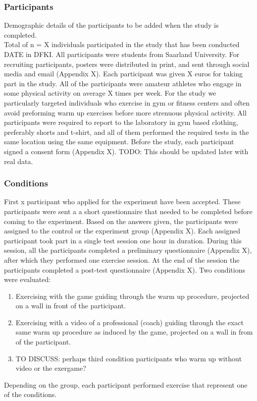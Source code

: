 \subsubsection{Participants}
Demographic details of the participants to be added when the study is completed.\\
Total of n = X individuals participated in the study that has been conducted DATE in DFKI. All participants were students from Saarland University. For recruiting participants, posters were distributed in print, and sent through social media and email (Appendix X). Each participant was given X euros for taking part in the study. All of the participants were amateur athletes who engage in some physical activity on average X times per week. For the study we particularly targeted individuals who exercise in gym or fitness centers and often avoid preforming warm up exercises before more strenuous physical activity. All participants were required to report to the laboratory in gym based clothing, preferably shorts and t-shirt, and all of them performed the required tests in the same location using the same equipment. Before the study, each participant signed a consent form (Appendix X). TODO: This should be updated later with real data.
\subsubsection{Conditions}
First x participant who applied for the experiment have been accepted. These participants were sent a a short questionnaire that needed to be completed before coming to the experiment. Based on the answers given, the participants were assigned to the control or the experiment group (Appendix X).
Each assigned participant took part in a single test session one hour in duration. During this session, all the participants completed a preliminary questionnaire (Appendix X), after which they performed one exercise session. At the end of the session the participants completed a post-test questionnaire (Appendix X). Two conditions were evaluated:
\begin{enumerate}
\item Exercising with the game guiding through the warm up procedure, projected on a wall in front of the participant.
\item Exercising with a video of a professional (coach) guiding through the exact same warm up procedure as induced by the game, projected on a wall in from of the participant.
\item TO DISCUSS: perhaps third condition participants who warm up without video or the exergame?
\end{enumerate}
Depending on the group, each participant performed exercise that represent one of the conditions.
